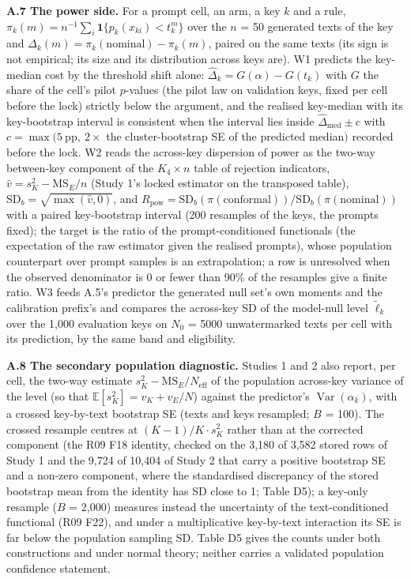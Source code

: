 \documentclass[11pt,letterpaper]{article}
\begin{document}
\textbf{A.7 The power side.} For a prompt cell, an arm, a key \(k\) and a rule, \(\pi_k(m) = n^{-1}\sum_i \mathbf 1\{p_k(x_{ki}) < t_k^m\}\) over the \(n\) = 50 generated texts of the key and \(\Delta_k(m) = \pi_k(\mathrm{nominal}) - \pi_k(m)\), paired on the same texts (its sign is not empirical; its size and its distribution across keys are). W1 predicts the key-median cost by the threshold shift alone: \(\hat\Delta_k = G(\alpha) - G(t_k)\) with \(G\) the share of the cell's pilot \(p\)-values (the pilot law on validation keys, fixed per cell before the lock) strictly below the argument, and the realised key-median with its key-bootstrap interval is consistent when the interval lies inside \(\hat\Delta_{\mathrm{med}} \pm c\) with \(c = \max(5\ \mathrm{pp},\ 2 \times\) the cluster-bootstrap SE of the predicted median\()\) recorded before the lock. W2 reads the across-key dispersion of power as the two-way between-key component of the \(K_4 \times n\) table of rejection indicators, \(\hat v = s_K^2 - \mathrm{MS}_E/n\) (Study 1's locked estimator on the transposed table), \(\mathrm{SD}_b = \sqrt{\max(\hat v, 0)}\), and \(R_{\mathrm{pow}} = \mathrm{SD}_b(\pi(\mathrm{conformal}))/\mathrm{SD}_b(\pi(\mathrm{nominal}))\) with a paired key-bootstrap interval (200 resamples of the keys, the prompts fixed); the target is the ratio of the prompt-conditioned functionals (the expectation of the raw estimator given the realised prompts), whose population counterpart over prompt samples is an extrapolation; a row is unresolved when the observed denominator is \(0\) or fewer than 90\% of the resamples give a finite ratio. W3 feeds A.5's predictor the generated null set's own moments and the calibration prefix's and compares the across-key SD of the model-null level \(\tilde\ell_k\) over the 1,000 evaluation keys on \(N_0\) = 5000 unwatermarked texts per cell with its prediction, by the same band and eligibility.

\textbf{A.8 The secondary population diagnostic.} Studies 1 and 2 also report, per cell, the two-way estimate \(s_K^2 - \mathrm{MS}_E/N_{\mathrm{eff}}\) of the population across-key variance of the level (so that \(\mathbb{E}[s_K^2] = v_K + v_E/N\)) against the predictor's \(\operatorname{Var}(\alpha_k)\), with a crossed key-by-text bootstrap SE (texts and keys resampled; \(B\) = 100). The crossed resample centres at \((K-1)/K \cdot s_K^2\) rather than at the corrected component (the R09 F18 identity, checked on the 3,180 of 3,582 stored rows of Study 1 and the 9,724 of 10,404 of Study 2 that carry a positive bootstrap SE and a non-zero component, where the standardised discrepancy of the stored bootstrap mean from the identity has SD close to 1; Table D5); a key-only resample (\(B\) = 2,000) measures instead the uncertainty of the text-conditioned functional (R09 F22), and under a multiplicative key-by-text interaction its SE is far below the population sampling SD. Table D5 gives the counts under both constructions and under normal theory; neither carries a validated population confidence statement.
\end{document}

